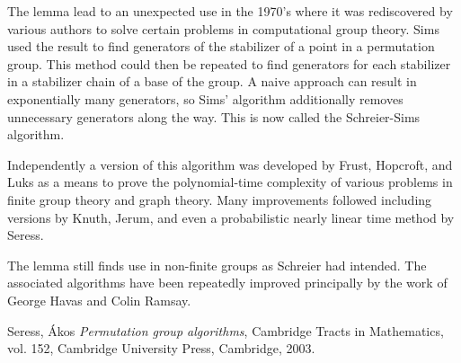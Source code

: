 \documentclass[12pt]{article}
\begin{document}
The lemma lead to an unexpected use in the 1970's where it was rediscovered by various authors  
to solve certain problems in computational group theory.  Sims used the result to find
generators of the stabilizer of a point in a permutation group.  This method could then be
repeated to find generators for each stabilizer in a stabilizer chain of a base of the group.
A naive approach can result in exponentially many generators, so Sims' algorithm additionally
removes unnecessary generators along the way.  This is now called the Schreier-Sims algorithm.

Independently a version of this algorithm was developed by Frust, Hopcroft, and Luks as a means to 
prove the polynomial-time complexity of various problems in finite group theory and graph 
theory.  Many improvements followed including versions by Knuth, Jerum, and even a probabilistic
nearly linear time method by Seress.

The lemma still finds use in non-finite groups as Schreier had intended.  The associated 
algorithms have been repeatedly improved principally by the work of George Havas and Colin Ramsay.




\providecommand{\bysame}{\leavevmode\hbox to3em{\hrulefill}\thinspace}
\providecommand{\MR}{\relax\ifhmode\unskip\space\fi MR }
\providecommand{\MRhref}[2]{%
  \href{http://www.ams.org/mathscinet-getitem?mr=#1}{#2}
}
\providecommand{\href}[2]{#2}
\begin{thebibliography}{10}


Seress, {\'A}kos
    \emph{Permutation group algorithms},
    Cambridge Tracts in Mathematics, vol. 152,
    Cambridge University Press, Cambridge, 2003.

\end{thebibliography}

\end{document}
